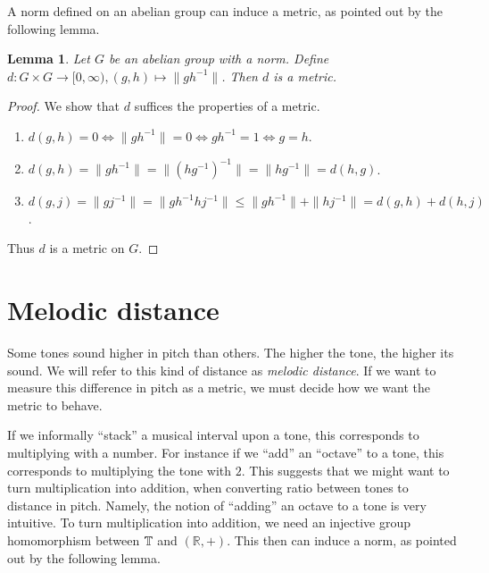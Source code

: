 \documentclass[a4paper]{book}
\newtheorem{lemma}[theorem]{Lemma}
\theoremstyle{definition}
\begin{document}
A norm defined on an abelian group can induce a metric, as pointed out by the following lemma.

\begin{lemma}
    Let $G$ be an abelian group with a norm.
    Define $d:G \times G \to [0,\infty), (g,h) \mapsto \|gh^{-1}\|$.
    Then $d$ is a metric.
	\label{norm_to_metric}
\end{lemma}
\begin{proof}
	We show that $d$ suffices the properties of a metric.
    \begin{enumerate}[i]
        \item $d(g,h) = 0 \Leftrightarrow \|gh^{-1}\| = 0 \Leftrightarrow gh^{-1} = 1 \Leftrightarrow g = h$.
        \item $d(g,h) = \|gh^{-1}\| = \|(hg^{-1})^{-1}\| = \|hg^{-1}\| = d(h,g)$.
        \item $d(g,j) = \|gj^{-1}\| = \|gh^{-1}hj^{-1}\| \leq \|gh^{-1}\|+ \|hj^{-1}\| = d(g,h) + d(h,j)$.
    \end{enumerate}
	Thus $d$ is a metric on $G$.
\end{proof}

\section{Melodic distance}
Some tones sound higher in pitch than others.
The higher the tone, the higher its sound.
We will refer to this kind of distance as \emph{melodic distance}.
If we want to measure this difference in pitch as a metric, we must decide how we want the metric to behave.

If we informally ``stack'' a musical interval upon a tone, this corresponds to multiplying with a number.
For instance if we ``add'' an ``octave'' to a tone, this corresponds to multiplying the tone with $2$.
This suggests that we might want to turn multiplication into addition, when converting ratio between tones to distance in pitch.
Namely, the notion of ``adding'' an octave to a tone is very intuitive.
To turn multiplication into addition, we need an injective group homomorphism between $\mathbb{T}$ and $(\mathbb{R},+)$.
This then can induce a norm, as pointed out by the following lemma.
\end{document}

